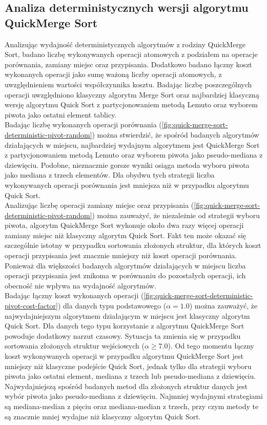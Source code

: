 

\subsection{Analiza deterministycznych wersji algorytmu QuickMerge Sort}
Analizując wydajność deterministycznych algorytmów z rodziny QuickMerge Sort, badano liczbę wykonywanych operacji atomowych z podziałem na operacje porównania, zamiany miejsc oraz przypisania. Dodatkowo badano łączny koszt wykonanych operacji jako sumę ważoną liczby operacji atomowych, z uwzględnieniem wartości współczynnika kosztu. Badając liczbę poszczególnych operacji uwzględniono klasyczny algorytm Merge Sort oraz najbardziej klasyczną wersję algorytmu Quick Sort z partycjonowaniem metodą Lemuto oraz wyborem piwota jako ostatni element tablicy.\\ 

Badając liczbę wykonanych operacji porównania (\ref{fig:quick-merge-sort-deterministic-pivot-random}) można stwierdzić, 
że spośród badanych algorytmów działających w miejscu, najbardziej wydajnym algorytmem jest QuickMerge Sort z partycjonowaniem metodą Lemuto oraz wyborem piwota jako pseudo-mediana z dziewięciu. Podobne, nieznacznie gorsze wyniki osiąga metoda wyboru piwota jako mediana z trzech elementów. Dla obydwu tych strategii liczba wykonywanych operacji porównania jest mniejsza niż w przypadku algorytmu Quick Sort.\\

Analizując liczbę operacji zamiany miejsc oraz przypisania (\ref{fig:quick-merge-sort-deterministic-pivot-random}) można zauważyć, że niezależnie od strategii wyboru piwota, algorytm QuickMerge Sort wykonuje około dwa razy więcej operacji zamiany miejsc niż klasyczny algorytm Quick Sort. Fakt ten może okazać się szczególnie istotny w przypadku sortowania złożonych struktur, dla których koszt operacji przypisania jest znacznie mniejszy niż koszt operacji porównania. Ponieważ dla większości badanych algorytmów działających w miejscu liczba operacji przypisania jest znikoma w porównaniu do pozostałych operacji, ich obecność nie wpływa na wydajność algorytmów.\\

Badając łączny koszt wykonanych operacji (\ref{fig:quick-merge-sort-deterministic-pivot-cost-factor}) dla danych typu podstawowego ($\alpha = 1.0$) można zauważyć, że najwydajniejszym algorytmem działającym w miejscu jest klasyczny algorytm Quick Sort. Dla danych tego typu korzystanie z algorytmu QuickMerge Sort powoduje dodatkowy narzut czasowy. Sytuacja ta zmienia się w przypadku sortowania złożonych struktur wejściowych ($\alpha \ge 7.0$). Od tego momentu łączny koszt wykonywanych operacji w przypadku algorytmu QuickMerge Sort jest mniejszy niż klasyczne podejście Quick Sort, jednak tylko dla strategii wyboru piwota jako ostatni element, mediana z trzech lub pseudo-mediana z dziewięciu. Najwydajniejszą spośród badanych metod dla złożonych struktur danych jest wybór piwota jako pseudo-mediana z dziewięciu. Najmniej wydajnymi strategiami są mediana-median z pięciu oraz mediana-median z trzech, przy czym metody te są znacznie mniej wydajne niż klasyczny algorytm Quick Sort.\\

